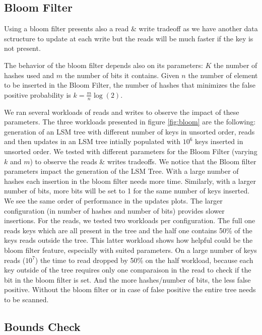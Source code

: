 \documentclass{sig-alternate-05-2015}
\begin{document}
\subsection{Bloom Filter}
Using a bloom filter presents also a read \& write tradeoff as we have another data sctructure to update at each write but the reads will be much faster if the key is not present.

The behavior of the bloom filter depends also on its parameters: $K$ the number of hashes used and $m$ the number of bits it contains. Given $n$ the number of element to be inserted in the Bloom Filter, the number of hashes that minimizes the false positive probability is $k = \frac{m}{n} \log(2)$.

We ran several workloads of reads and writes to observe the impact of these parameters. The three workloads presented in figure \ref{fig:bloom} are the following: generation of an LSM tree with different number of keys in unsorted order, reads and then updates in an LSM tree intially populated with $10^6$ keys inserted in unsorted order. We tested with different parameters for the Bloom Filter (varying $k$ and $m$) to observe the reads \& writes tradeoffs. We notice that the Bloom filter parameters impact the generation of the LSM Tree. With a large number of hashes each insertion in the bloom filter needs more time. Similarly, with a larger number of bits, more bits will be set to 1 for the same number of keys inserted. We see the same order of performance in the updates plots. The larger configuration (in number of hashes and number of bits) provides slower insertions. For the reads, we tested two workloads per configuration. The full one reads keys which are all present in the tree and the half one contains 50\% of the keys reads outside the tree. This latter workload shows how helpful could be the bloom filter feature, especially with suited parameters. On a large number of keys reads ($10^7$) the time to read dropped by 50\% on the half workload, because each key outside of the tree requires only one comparaison in the read to check if the bit in the bloom filter is set. And the more hashes/number of bits, the less false positive. Without the bloom filter or in case of false positive the entire tree needs to be scanned.



\subsection{Bounds Check}
\end{document}
